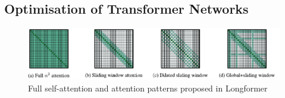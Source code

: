 \subsection{Optimisation of Transformer Networks}
\citet{wu2020lite}

\citet{mehta2020delight}

\citet{beltagy2020longformer}

\begin{figure}[!ht]
    \centering
    \includegraphics[width=\textwidth]{literature/imgs/ext-longformer.pdf}
    \caption{Full self-attention and attention patterns proposed in Longformer \cite{beltagy2020longformer}}
    \label{fig:ext-longformer}
\end{figure}